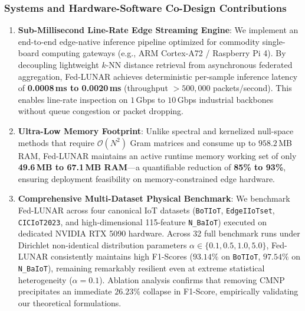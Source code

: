 \subsubsection{Systems and Hardware-Software Co-Design Contributions}
\begin{enumerate}
    \item \textbf{Sub-Millisecond Line-Rate Edge Streaming Engine}: We implement an end-to-end edge-native inference pipeline optimized for commodity single-board computing gateways (e.g., ARM Cortex-A72 / Raspberry Pi 4). By decoupling lightweight $k$-NN distance retrieval from asynchronous federated aggregation, Fed-LUNAR achieves deterministic per-sample inference latency of \textbf{0.0008\,ms to 0.0020\,ms} (throughput $>500{,}000$ packets/second). This enables line-rate inspection on $1$\,Gbps to $10$\,Gbps industrial backbones without queue congestion or packet dropping.
    \item \textbf{Ultra-Low Memory Footprint}: Unlike spectral and kernelized null-space methods that require $\mathcal{O}(N^2)$ Gram matrices and consume up to $958.2$\,MB RAM, Fed-LUNAR maintains an active runtime memory working set of only \textbf{49.6\,MB to 67.1\,MB RAM}---a quantifiable reduction of \textbf{85\% to 93\%}, ensuring deployment feasibility on memory-constrained edge hardware.
    \item \textbf{Comprehensive Multi-Dataset Physical Benchmark}: We benchmark Fed-LUNAR across four canonical IoT datasets (\texttt{BoTIoT}, \texttt{EdgeIIoTset}, \texttt{CICIoT2023}, and high-dimensional 115-feature \texttt{N\_BaIoT}) executed on dedicated NVIDIA RTX 5090 hardware. Across 32 full benchmark runs under Dirichlet non-identical distribution parameters $\alpha \in \{0.1, 0.5, 1.0, 5.0\}$, Fed-LUNAR consistently maintains high F1-Scores ($93.14\%$ on \texttt{BoTIoT}, $97.54\%$ on \texttt{N\_BaIoT}), remaining remarkably resilient even at extreme statistical heterogeneity ($\alpha=0.1$). Ablation analysis confirms that removing CMNP precipitates an immediate $26.23\%$ collapse in F1-Score, empirically validating our theoretical formulations.
\end{enumerate}

